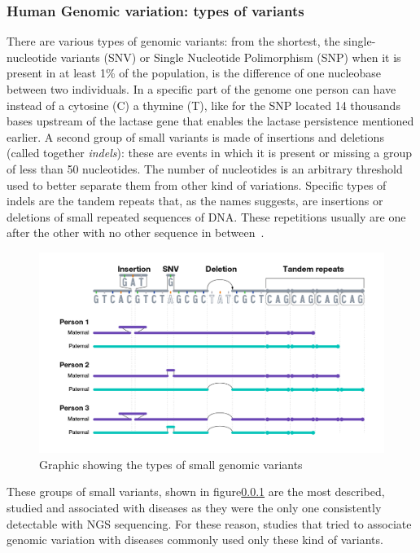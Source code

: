 \subsubsection{Human Genomic variation: types of variants}
There are various types of genomic variants: from the shortest, the single-nucleotide variants (SNV) or Single Nucleotide Polimorphism (SNP) when it is present in at least 1\% of the population, is the difference of one nucleobase between two individuals. In a specific part of the genome one person can have instead of a cytosine (C) a thymine (T), like for the SNP located 14 thousands bases upstream of the lactase gene that enables the lactase persistence mentioned earlier\cite{lactase_persistance}.
A second group of small variants is made of insertions and deletions (called together \emph{indels}): these are events in which it is present or missing a group of less than 50 nucleotides. The number of nucleotides is an arbitrary threshold used to better separate them from other kind of variations. Specific types of indels are the tandem repeats that, as the names suggests, are insertions or deletions of small repeated sequences of DNA. These repetitions usually are one after the other with no other sequence in between~\cite{nih_variation}.\\
\begin{figure}[h!]
	\centering
	\includegraphics[width=.8\linewidth]{figures/background/small_variants.png}
	\caption[Small genomic variants.]{Graphic showing the types of small genomic variants~\cite{nih_variation}}
	\label{fig:small_variants}
\end{figure}
These groups of small variants, shown in figure\ref{} are the most described, studied and associated with diseases as they were the only one consistently detectable with NGS sequencing. For these reason, studies that tried to associate genomic variation with diseases commonly used only these kind of variants.\\
